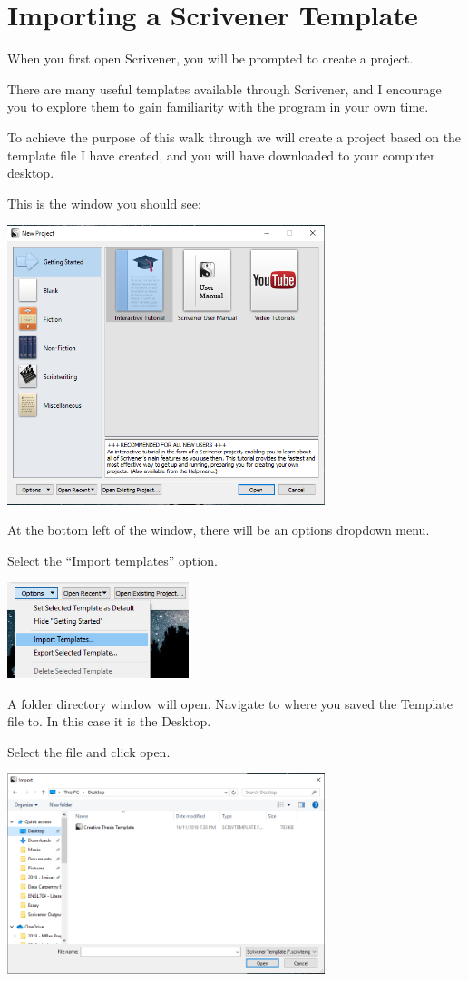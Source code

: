 \documentclass{article}
\begin{document}
\section{Importing a Scrivener Template}

When you first open Scrivener, you will be prompted to create a project. 

There are many useful templates available through Scrivener, and I encourage you to explore them to gain familiarity with the program in your own time. 

To achieve the purpose of this walk through we will create a project based on the template file I have created, and you will have downloaded to your computer desktop.

This is the window you should see:

\includegraphics[width=350px]{images/scriv001.PNG}

At the bottom left of the window, there will be an options dropdown menu. 

Select the ``Import templates'' option.

\includegraphics[width=200px]{images/scriv002.PNG}

A folder directory window will open. Navigate to where you saved the Template file to. In this case it is the Desktop.

Select the file and click open.

\includegraphics[width=350px]{images/scriv003.PNG}
\end{document}
